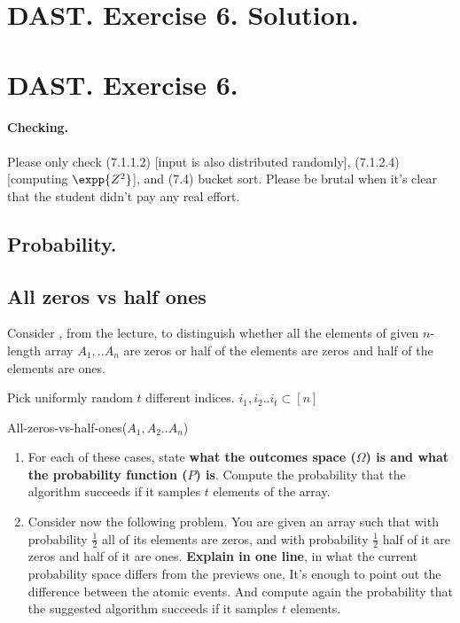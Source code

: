   \section{DAST. Exercise 6. Solution.}
\else
  \section{DAST. Exercise 6.}
\fi

\ifdefined\CHECK


  \paragraph{Checking.} Please only check (7.1.1.2) [input is also distributed randomly], (7.1.2.4) [computing $\expp{Z^{2}}$], and (7.4) bucket sort. Please be brutal when it's clear that the student didn't pay any real effort.
\paragraph{}

\fi

\subsection{Probability.} 
\subsection{All zeros vs half ones} Consider , from the lecture, to distinguish whether all the elements of given $n$-length array $A_{1},..A_{n}$ are zeros or half of the elements are zeros and half of the elements are ones. 

\begin{algorithm}
  Pick uniformly random $t$ different indices. $i_{1},i_{2}..i_{t} \subset [n]$ \\
\caption{All-zeros-vs-half-ones($A_{1},A_{2}..A_{n}$)}
  \label{alg:allzeros}
  \end{algorithm} 
\begin{enumerate}
  \item For each of these cases, state \textbf{what the outcomes space ($\Omega$) is and what the probability function ($P$) is}. Compute the probability that the algorithm succeeds if it samples $t$ elements of the array.  
  \item Consider now the following problem. You are given an array such that with probability $\frac{1}{2}$ all of its elements are zeros, and with probability $\frac{1}{2}$ half of it are zeros and half of it are ones. \textbf{Explain in one line}, in what the current probability space differs from the previews one, It's enough to point out the difference between the atomic events. And compute again the probability that the suggested algorithm succeeds if it samples $t$ elements. 


\end{enumerate}

